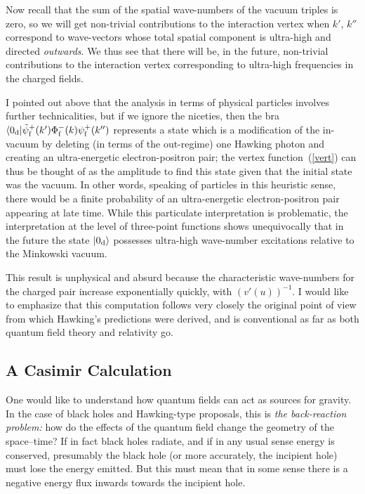 \documentclass[12pt]{article}
\begin{document}
Now recall that the sum of the spatial wave-numbers of the vacuum triples is zero, so we will get non-trivial contributions to the interaction vertex when $k'$, $k''$ correspond to wave-vectors whose total spatial component is ultra-high and directed {\em outwards}.  We thus see that there will be, in the future, non-trivial contributions to the interaction vertex corresponding to ultra-high frequencies in the charged fields.  

I pointed out above that the analysis in terms of physical particles involves further technicalities, but if we ignore the niceties, then the bra $\langle 0_{\rm d}|{\tilde\psi}_{\rm f}^+(k')\Phi _{\rm f}^- (k)\psi _{\rm f}^+ (k'')$ represents a state 
which is a modification of the in-vacuum by deleting (in terms of the out-regime)
one Hawking photon and creating an ultra-energetic electron-positron pair; the vertex function~(\ref{vert}) can thus be thought of as the amplitude to find this state given that the initial state was the vacuum.  In other words, speaking of particles in this heuristic sense, there would be a finite probability of an ultra-energetic electron-positron pair appearing at late time.  While this particulate interpretation is problematic, the interpretation at the level of three-point functions shows unequivocally that  in the future the state $|0_{\rm d}\rangle$ possesses ultra-high wave-number excitations relative to the Minkowski vacuum.

This result is unphysical and absurd because the characteristic wave-numbers for the charged pair increase exponentially quickly, with $(v'(u))^{-1}$.  
I would like to emphasize that this computation follows very closely the original point of view from which Hawking's predictions were derived, and is conventional as far as both quantum field theory and relativity go.  

\subsection{A Casimir Calculation}

One would like to understand how quantum fields can act as sources for gravity.  In the case of black holes and Hawking-type proposals, this is {\em the back-reaction problem:}  how do the effects of the quantum field change the geometry of the space--time?  If in fact black holes radiate, and if in any usual sense energy is conserved, presumably the black hole (or more accurately, the incipient hole) must lose the energy emitted.  But this must mean that in some sense there is a negative energy flux inwards towards the incipient hole.
\end{document}
